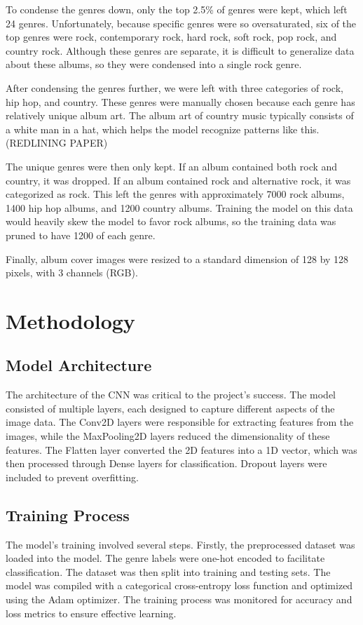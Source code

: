 \documentclass[12pt]{article}
\begin{document}
To condense the genres down, only the top 2.5\% of genres were kept, which left 24 genres. Unfortunately, because specific genres were so oversaturated, six of the top genres were rock, contemporary rock, hard rock, soft rock, pop rock, and country rock. Although these genres are separate, it is difficult to generalize data about these albums, so they were condensed into a single rock genre.

After condensing the genres further, we were left with three categories of rock, hip hop, and country. These genres were manually chosen because each genre has relatively unique album art. The album art of country music typically consists of a white man in a hat, which helps the model recognize patterns like this. (REDLINING PAPER)

The unique genres were then only kept. If an album contained both rock and country, it was dropped. If an album contained rock and alternative rock, it was categorized as rock. This left the genres with approximately 7000 rock albums, 1400 hip hop albums, and 1200 country albums. Training the model on this data would heavily skew the model to favor rock albums, so the training data was pruned to have 1200 of each genre.

Finally, album cover images were resized to a standard dimension of 128 by 128 pixels, with 3 channels (RGB). 

\section{Methodology}
\subsection{Model Architecture}
The architecture of the CNN was critical to the project's success. The model consisted of multiple layers, each designed to capture different aspects of the image data. The Conv2D layers were responsible for extracting features from the images, while the MaxPooling2D layers reduced the dimensionality of these features. The Flatten layer converted the 2D features into a 1D vector, which was then processed through Dense layers for classification. Dropout layers were included to prevent overfitting.

\subsection{Training Process}
The model's training involved several steps. Firstly, the preprocessed dataset was loaded into the model. The genre labels were one-hot encoded to facilitate classification. The dataset was then split into training and testing sets. The model was compiled with a categorical cross-entropy loss function and optimized using the Adam optimizer. The training process was monitored for accuracy and loss metrics to ensure effective learning.
\end{document}
